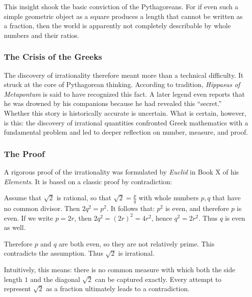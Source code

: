 This insight shook the basic conviction of the Pythagoreans.
For if even such a simple geometric object as a square
produces a length that cannot be written as a fraction,
then the world is apparently not completely describable
by whole numbers and their ratios.

\subsubsection*{The Crisis of the Greeks}
The discovery of irrationality therefore meant more
than a technical difficulty.
It struck at the core of Pythagorean thinking.
According to tradition, \emph{Hippasus of Metapontum}
is said to have recognized this fact.
A later legend even reports
that he was drowned by his companions
because he had revealed this ``secret.''
Whether this story is historically accurate is uncertain.
What is certain, however, is this:
the discovery of irrational quantities confronted Greek mathematics
with a fundamental problem
and led to deeper reflection on number, measure, and proof.

\newpage
\noindent
\subsubsection*{The Proof}
A rigorous proof of the irrationality was formulated by \emph{Euclid}
in Book X of his \emph{Elements}.
It is based on a classic proof by contradiction:

\begin{MathBox}
		\label{box:contradiction}
	Assume that $\sqrt{2}$ is rational, so that $\sqrt{2}=\tfrac{p}{q}$ with
	whole numbers $p,q$ that have no common divisor.
	Then $2q^2=p^2$.
	It follows that:
	$p^2$ is even, and therefore $p$ is even.
	If we write $p=2r$, then
	$2q^2=(2r)^2=4r^2$, hence $q^2=2r^2$.
	Thus $q$ is even as well.
	
	Therefore $p$ and $q$ are both even,
	so they are not relatively prime.
	This contradicts the assumption.
	Thus $\sqrt{2}$ is irrational.
\end{MathBox}

Intuitively, this means:
there is no common measure
with which both the side length $1$
and the diagonal $\sqrt{2}$ can be captured exactly.
Every attempt to represent $\sqrt{2}$ as a fraction
ultimately leads to a contradiction.

